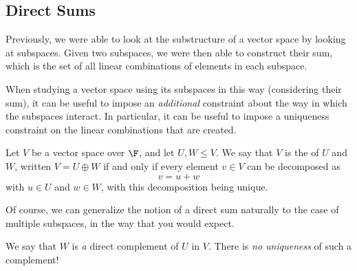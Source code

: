 \documentclass[a4paper]{scrartcl}
\begin{document}
\subsection{Direct Sums}

Previously, we were able to look at the substructure of a vector space by looking at subspaces. Given two subspaces, we were then able to construct their sum, which is the set of all linear combinations of elements in each subspace. 

When studying a vector space using its subspaces in this way (considering their sum), it can be useful to impose an \emph{additional} constraint about the way in which the subspaces interact. In particular, it can be useful to impose a uniqueness constraint on the linear combinations that are created.

\begin{definition}
    Let $V$ be a vector space over $\F$, and let $U, W \leq V$. We say that $V$ is the  of $U$ and $W$, written $V = U \oplus W$ if and only if every element $v \in V$ can be decomposed as
    $$
    v = u + w
    $$
    with $u \in U$ and $w \in W$, with this decomposition being unique.
\end{definition}

Of course, we can generalize the notion of a direct sum naturally to the case of multiple subspaces, in the way that you would expect.

\begin{remark}[Warning]
    We say that $W$ is \emph{a} direct complement of $U$ in $V$. There is \emph{no uniqueness} of such a complement!
\end{remark}
\end{document}
